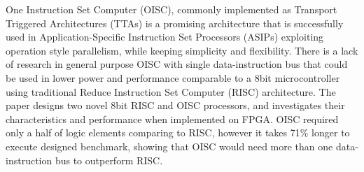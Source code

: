 \iffalse
The abstract is written last and summarises the important points you are making in the report using one sentence for each point:

* What is the topic of the work? What is the goal?
* Why are you doing it? What are your motivations?
* Does this work appear in the literature and if so, what are you doing differently?
* What is the most significant result? Was it unexpected? What impact will it have?
\fi

One Instruction Set Computer (OISC), commonly implemented as Transport Triggered Architectures (TTAs) is a promising architecture that is successfully used in Application-Specific Instruction Set Processors (ASIPs) exploiting operation style parallelism, while keeping simplicity and flexibility. There is a lack of research in general purpose OISC with single data-instruction bus that could be used in lower power and performance comparable to a 8bit microcontroller using traditional Reduce Instruction Set Computer (RISC) architecture. The paper designs two novel 8bit RISC and OISC processors, and investigates their characteristics and performance when implemented on FPGA. OISC required only a half of logic elements comparing to RISC, however it takes 71\% longer to execute designed benchmark, showing that OISC would need more than one data-instruction bus to outperform RISC.
